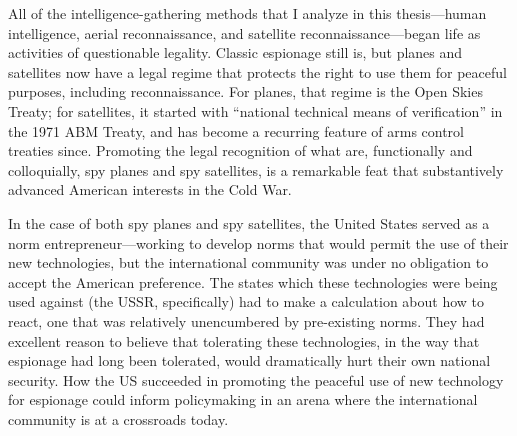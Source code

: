 \documentclass{memoir}
\begin{document}
\begin{refsegment}
All of the intelligence-gathering methods that I analyze in this thesis---human intelligence, aerial reconnaissance, and satellite reconnaissance---began life as activities of questionable legality. Classic espionage still is, but planes and satellites now have a legal regime that protects the right to use them for peaceful purposes, including reconnaissance. For planes, that regime is the Open Skies Treaty; for satellites, it started with ``national technical means of verification'' in the 1971 ABM Treaty, and has become a recurring feature of arms control treaties since. Promoting the legal recognition of what are, functionally and colloquially, spy planes and spy satellites, is a remarkable feat that substantively advanced American interests in the Cold War.

In the case of both spy planes and spy satellites, the United States served as a norm entrepreneur---working to develop norms that would permit the use of their new technologies, but the international community was under no obligation to accept the American preference. The states which these technologies were being used against (the USSR, specifically) had to make a calculation about how to react, one that was relatively unencumbered by pre-existing norms. They had excellent reason to believe that tolerating these technologies, in the way that espionage had long been tolerated, would dramatically hurt their own national security. How the US succeeded in promoting the peaceful use of new technology for espionage could inform policymaking in an arena where the international community is at a crossroads today.



\end{refsegment}
\end{document}
